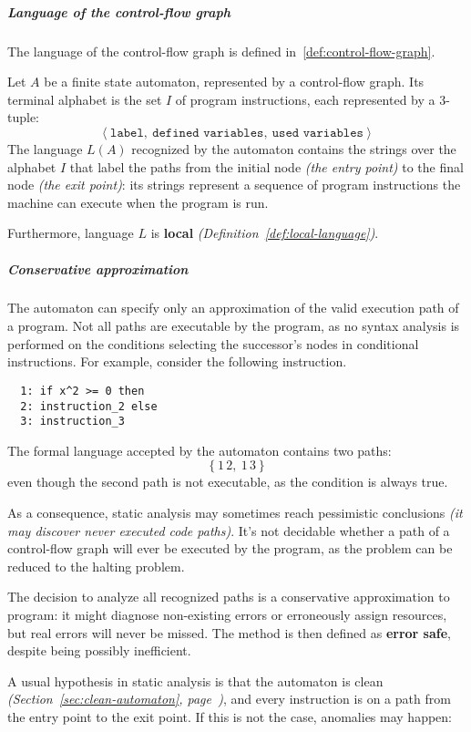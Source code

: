 \documentclass[english]{article}
\begin{document}
\subparagraph*{Language of the control-flow graph}
The language of the control-flow graph is defined in~\ref{def:control-flow-graph}.

\begin{definition}
  \label{def:control-flow-graph}
  Let \(A\) be a finite state automaton, represented by a control-flow graph.
  Its terminal alphabet is the set \(I\) of program instructions, each represented by a \(3\)-tuple:
  \[ \left\langle \texttt{label},\ \texttt{defined variables},\ \texttt{used variables} \right\rangle \]
  The language \(L(A)\) recognized by the automaton contains the strings over the alphabet \(I\) that label the paths from the initial node \textit{(the entry point)} to the final node \textit{(the exit point)}:
  its strings represent a sequence of program instructions the machine can execute when the program is run.
\end{definition}

Furthermore, language \(L\) is \textbf{local} \textit{(Definition~\ref{def:local-language})}.

\subparagraph*{Conservative approximation}

The automaton can specify only an approximation of the valid execution path of a program.
Not all paths are executable by the program, as no syntax analysis is performed on the conditions selecting the successor's nodes in conditional instructions.
For example, consider the following instruction.
\begin{verbatim}
  1: if x^2 >= 0 then
  2: instruction_2 else
  3: instruction_3
\end{verbatim}
The formal language accepted by the automaton contains two paths:
\[ \left\{ 1 \, 2, \ 1 \, 3 \right\} \]
even though the second path is not executable, as the condition is always true.

As a consequence, static analysis may sometimes reach pessimistic conclusions \textit{(it may discover never executed code paths)}.
It's not decidable whether a path of a control-flow graph will ever be executed by the program, as the problem can be reduced to the halting problem.

The decision to analyze all recognized paths is a conservative approximation to program:
it might diagnose non-existing errors or erroneously assign resources, but real errors will never be missed.
The method is then defined as \textbf{error safe}, despite being possibly inefficient.

A usual hypothesis in static analysis is that the automaton is clean \textit{(Section~\ref{sec:clean-automaton}, page~\pageref{sec:clean-automaton})}, and every instruction is on a path from the entry point to the exit point.
If this is not the case, anomalies may happen:
\end{document}
